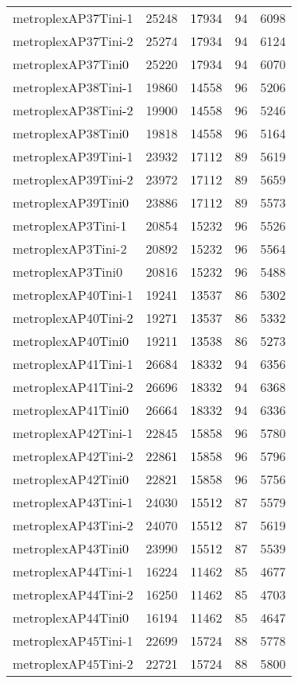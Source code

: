 \begin{longtable}{lrrrr}
metroplexAP37Tini-1 & 25248 & 17934 & 94 & 6098 \\
metroplexAP37Tini-2 & 25274 & 17934 & 94 & 6124 \\
metroplexAP37Tini0 & 25220 & 17934 & 94 & 6070 \\
metroplexAP38Tini-1 & 19860 & 14558 & 96 & 5206 \\
metroplexAP38Tini-2 & 19900 & 14558 & 96 & 5246 \\
metroplexAP38Tini0 & 19818 & 14558 & 96 & 5164 \\
metroplexAP39Tini-1 & 23932 & 17112 & 89 & 5619 \\
metroplexAP39Tini-2 & 23972 & 17112 & 89 & 5659 \\
metroplexAP39Tini0 & 23886 & 17112 & 89 & 5573 \\
metroplexAP3Tini-1 & 20854 & 15232 & 96 & 5526 \\
metroplexAP3Tini-2 & 20892 & 15232 & 96 & 5564 \\
metroplexAP3Tini0 & 20816 & 15232 & 96 & 5488 \\
metroplexAP40Tini-1 & 19241 & 13537 & 86 & 5302 \\
metroplexAP40Tini-2 & 19271 & 13537 & 86 & 5332 \\
metroplexAP40Tini0 & 19211 & 13538 & 86 & 5273 \\
metroplexAP41Tini-1 & 26684 & 18332 & 94 & 6356 \\
metroplexAP41Tini-2 & 26696 & 18332 & 94 & 6368 \\
metroplexAP41Tini0 & 26664 & 18332 & 94 & 6336 \\
metroplexAP42Tini-1 & 22845 & 15858 & 96 & 5780 \\
metroplexAP42Tini-2 & 22861 & 15858 & 96 & 5796 \\
metroplexAP42Tini0 & 22821 & 15858 & 96 & 5756 \\
metroplexAP43Tini-1 & 24030 & 15512 & 87 & 5579 \\
metroplexAP43Tini-2 & 24070 & 15512 & 87 & 5619 \\
metroplexAP43Tini0 & 23990 & 15512 & 87 & 5539 \\
metroplexAP44Tini-1 & 16224 & 11462 & 85 & 4677 \\
metroplexAP44Tini-2 & 16250 & 11462 & 85 & 4703 \\
metroplexAP44Tini0 & 16194 & 11462 & 85 & 4647 \\
metroplexAP45Tini-1 & 22699 & 15724 & 88 & 5778 \\
metroplexAP45Tini-2 & 22721 & 15724 & 88 & 5800 \\

\end{longtable}
